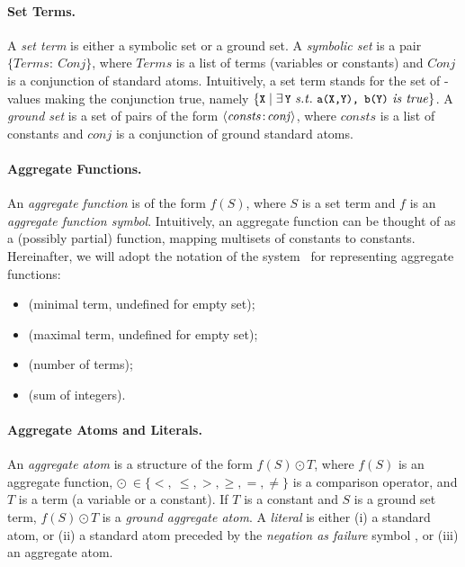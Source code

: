 \documentclass{tlp}
\begin{document}
\paragraph{Set Terms.}
A {\em set term} is either a symbolic set or a ground set.
A {\em symbolic set} is a pair $\{\mathit{Terms}:\ \mathit{Conj}\}$, where $\mathit{Terms}$ is a list of terms (variables or constants) and $\mathit{Conj}$ is a conjunction of standard atoms.
Intuitively, a set term  stands for the set of -values making the conjunction  true, namely $\{\mytt{X} \mid \exists\,\mytt{Y}\ \mathit{s.t.} \ \mytt{a(X,Y), b(Y)} \ \mathit{is\ true}\}$.
A {\em ground set} is a set of pairs of the form $\langle\mathit{consts}\! :\!\mathit{conj}\rangle$, where $\mathit{consts}$ is a list of constants and $\mathit{conj}$ is a conjunction of ground standard atoms.


\paragraph{Aggregate Functions.}
An {\em aggregate function} is of the form $f(S)$, where $S$ is a set term and $f$ is an {\em aggregate function symbol}.
Intuitively, an aggregate function can be thought of as a (possibly partial) function, mapping multisets of constants to constants.
Hereinafter, we will adopt the notation of the \dlv system~\cite{leon-etal-2002-dlv} for representing aggregate functions:
\begin{itemize}
\item {} (minimal term, undefined for empty set);
\item {} (maximal term, undefined for empty set);
\item {} (number of terms);
\item {} (sum of integers).
\end{itemize}


\paragraph{Aggregate Atoms and Literals.}
An {\em aggregate atom} is a structure of the form $f(S) \odot T$, where $f(S)$ is an aggregate function, $\odot\ \in \{ <,\ \leq, >, \geq, =, \neq \}$ is a comparison operator, and $T$ is a term (a variable or a constant).
If $T$ is a constant and $S$ is a ground set term, $f(S) \odot T$ is a {\em ground aggregate atom}.
A {\em literal} is either
(i) a standard atom, or
(ii) a standard atom preceded by the {\em negation as failure} symbol , or
(iii) an aggregate atom.
\end{document}
